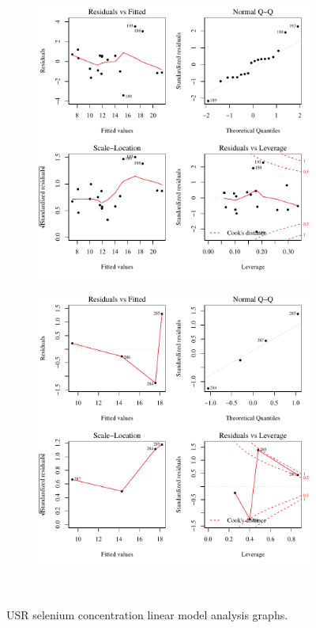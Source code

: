 \subfiguremid
\begin{landscape}
	\begin{figure}
		\begin{subfigure}{0.7\textwidth}
			\centering
			\includegraphics[width=\tableCustomSize]{"Figures/Results_USR/Stochastic/Conc Model lm-fit TIM"}
		\end{subfigure}%
		\begin{subfigure}{0.7\textwidth}
			\centering
			\includegraphics[width=\tableCustomSize]{"Figures/Results_USR/Stochastic/Conc Model lm-fit HRC"}
		\end{subfigure}\\
		\caption{USR selenium concentration linear model analysis graphs.}
	\end{figure}
\end{landscape}

